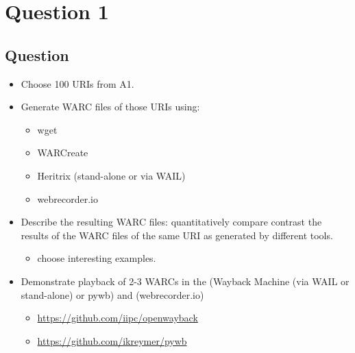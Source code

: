 \chapter{Question 1}
\label{question-1}
\section{Question}

\begin{itemize}
\item Choose 100 URIs from A1.
\item Generate WARC files of those URIs using:
\begin{itemize}
\item wget
\item WARCreate
\item Heritrix (stand-alone or via WAIL)
\item webrecorder.io
\end{itemize}
\item Describe the resulting WARC files: quantitatively compare  contrast the results of the WARC files of the same URI as generated by different tools.
\begin{itemize}
\item choose interesting examples.
\end{itemize}
\item Demonstrate playback of 2-3 WARCs in the (Wayback Machine (via WAIL or stand-alone) or pywb) and (webrecorder.io)
\begin{itemize}
\item \hyperref[savePage]{https://github.com/iipc/openwayback}
\item \hyperref[savePage]{https://github.com/ikreymer/pywb}
\end{itemize}
\end{itemize}

